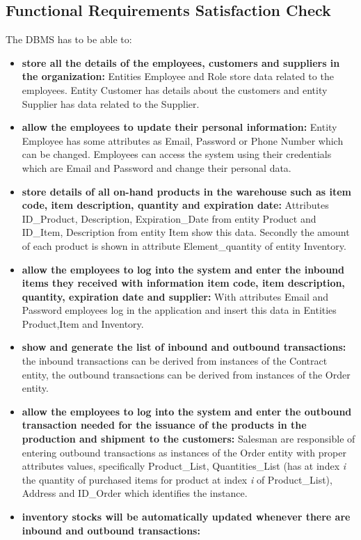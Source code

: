 \subsection{Functional Requirements Satisfaction Check}

The DBMS has to be able to:
\begin{itemize}
	\item \textbf{store all the details of the employees, customers and suppliers in the organization:} Entities Employee and Role store data related to the employees. Entity Customer has details about the customers and entity Supplier has data related to the Supplier.
	\item \textbf{allow the employees to update their personal information:} Entity Employee has some attributes as Email, Password or Phone Number which can be changed. Employees can access the system using their credentials which are Email and Password and change their personal data.
	\item \textbf{store details of all on-hand products in the warehouse such as item code, item description, quantity and expiration date:} Attributes ID\_Product, Description, Expiration\_Date from entity Product and ID\_Item, Description from entity Item show this data. Secondly the amount of each product is shown in attribute Element\_quantity of entity Inventory.  
	\item \textbf{allow the employees to log into the system and enter the inbound items they received with information item code, item description, quantity, expiration date and supplier:} With attributes Email and Password employees log in the application and insert this data in Entities Product,Item and Inventory.
	\item \textbf{show and generate the list of inbound and outbound transactions:} the inbound transactions can be derived from instances of the Contract entity, the outbound transactions can be derived from instances of the Order entity.
	\item \textbf{allow the employees to log into the system and enter the outbound transaction needed for the issuance of the products in the production and shipment to the customers:} Salesman are responsible of entering outbound transactions as instances of the Order entity with proper attributes values, specifically Product\_List, Quantities\_List (has at index \textit{i} the quantity of purchased items for product at index \textit{i} of Product\_List), Address and ID\_Order which identifies the instance.
    \item \textbf{inventory stocks will be automatically updated whenever there are inbound and outbound transactions:}

\end{itemize}
